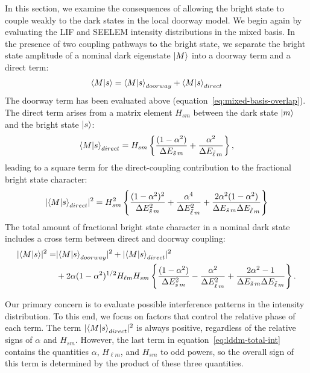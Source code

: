In this section, we examine the consequences of allowing the bright
state to couple weakly to the dark states in the local doorway model.
We begin again by evaluating the LIF and SEELEM intensity distributions
in the mixed basis. In the presence of two coupling pathways to the
bright state, we separate the bright state amplitude of a nominal dark
eigenstate $\mathinner{|{M}\rangle}$ into a doorway term and a direct term:
\begin{equation}
\mathinner{\langle{M|s}\rangle} = \mathinner{\langle{M|s}\rangle}_{doorway} + \mathinner{\langle{M|s}\rangle}_{direct}
\end{equation}
The doorway term has been evaluated above
(equation~\ref{eq:mixed-basis-overlap}).  The direct term arises from
a matrix element $H_{sm}$ between the dark state $\mathinner{|{m}\rangle}$ and the
bright state $\mathinner{|{s}\rangle}$:
\begin{equation}
\mathinner{\langle{M|s}\rangle}_{direct} = H_{sm} 
\left \lbrace 
  \frac{(1 - \alpha^2)}{\Delta E_{\tilde{s}\, m}} + 
  \frac{\alpha^2}{\Delta E_{\tilde{\ell}\, m}}
\right \rbrace,
\end{equation}
leading to a square term for the direct-coupling contribution to the
fractional bright state character:
\begin{equation}
  \label{eq:lddm-direct-int}
  \lvert \mathinner{\langle{M|s}\rangle}_{direct} \rvert^2 = H_{sm}^2
  \left \lbrace
    \frac{(1 - \alpha^2)^2}{\Delta E_{\tilde{s}\, m}^2} +
    \frac{\alpha^4}{\Delta E_{\tilde{\ell}\, m}^2} +
    \frac{2 \alpha^2 (1 - \alpha^2)}
         {\Delta E_{\tilde{s}\, m} \Delta E_{\tilde{\ell}\, m}}
  \right \rbrace
\end{equation}
The total amount of fractional bright state character in a nominal
dark state includes a cross term between direct and doorway coupling:
\begin{equation}
  \label{eq:lddm-total-int}
  \begin{split}
    \lvert \mathinner{\langle{M|s}\rangle} \rvert^2 =&
    \lvert \mathinner{\langle{M|s}\rangle}_{doorway} \rvert^2 + 
    \lvert \mathinner{\langle{M|s}\rangle}_{direct} \rvert^2 \\
    & + 2 \alpha (1-\alpha^2)^{1/2} H_{\ell m} H_{s m}
    \left \lbrace
      \frac{(1-\alpha^2)}{\Delta E_{\tilde{s}\, m}^2}
      - \frac{\alpha^2}{\Delta E_{\tilde{\ell}\, m}^2}
      + \frac{2\alpha^2 -1}{\Delta E_{\tilde{s}\, m} \Delta E_{\tilde{\ell}\, m}}
    \right \rbrace.\\
  \end{split}
\end{equation}

Our primary concern is to evaluate possible interference patterns in
the intensity distribution.  To this end, we focus on factors that control
the relative phase of each term.  The term $\lvert
\mathinner{\langle{M|s}\rangle}_{direct} \rvert^2$ is always positive, regardless of the
relative signs of $\alpha$ and $H_{sm}$.  However, the last term in
equation~\ref{eq:lddm-total-int} contains the quantities $\alpha$,
$H_{\ell m}$, and $H_{sm}$ to odd powers, so the overall sign of this
term is determined by the product of these three quantities.

